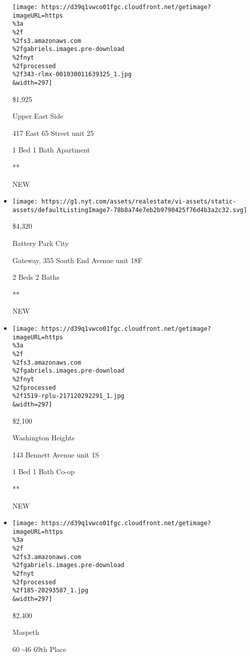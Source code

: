 \begin{itemize}
  \texttt{[image: https://d39q1vwco01fgc.cloudfront.net/getimage?imageURL=https\\\%3a\\\%2f\\\%2fs3.amazonaws.com\\\%2fgabriels.images.pre-download\\\%2fnyt\\\%2fprocessed\\\%2f343-rlmx-001030011639325\_1.jpg\\\&width=297]}

  \$1,925

  Upper East Side

  417 East 65 Street unit 25

  1 Bed \textbar{} 1 Bath \textbar{} Apartment

  **

  NEW
\item
  \href{/real-estate/usa/ny/new-york/battery-park-city/homes-for-rent/gateway-355-south-end-avenue/46-4337084?}{}

  \texttt{[image: https://g1.nyt.com/assets/realestate/vi-assets/static-assets/defaultListingImage7-78b8a74e7eb2b9790425f76d4b3a2c32.svg]}

  \$4,320

  Battery Park City

  Gateway, 355 South End Avenue unit 18F

  2 Beds \textbar{} 2 Baths \textbar{}

  **

  NEW
\item
  \href{/real-estate/usa/ny/new-york/washington-heights/homes-for-rent/143-bennett-avenue/1519-RPLU-217120292291?}{}

  \texttt{[image: https://d39q1vwco01fgc.cloudfront.net/getimage?imageURL=https\\\%3a\\\%2f\\\%2fs3.amazonaws.com\\\%2fgabriels.images.pre-download\\\%2fnyt\\\%2fprocessed\\\%2f1519-rplu-217120292291\_1.jpg\\\&width=297]}

  \$2,100

  Washington Heights

  143 Bennett Avenue unit 1S

  1 Bed \textbar{} 1 Bath \textbar{} Co-op

  **

  NEW
\item
  \href{/real-estate/usa/ny/queens/maspeth/homes-for-rent/60--46-69th-place/185-20293587?}{}

  \texttt{[image: https://d39q1vwco01fgc.cloudfront.net/getimage?imageURL=https\\\%3a\\\%2f\\\%2fs3.amazonaws.com\\\%2fgabriels.images.pre-download\\\%2fnyt\\\%2fprocessed\\\%2f185-20293587\_1.jpg\\\&width=297]}

  \$2,400

  Maspeth

  60 -46 69th Place


\end{itemize}

